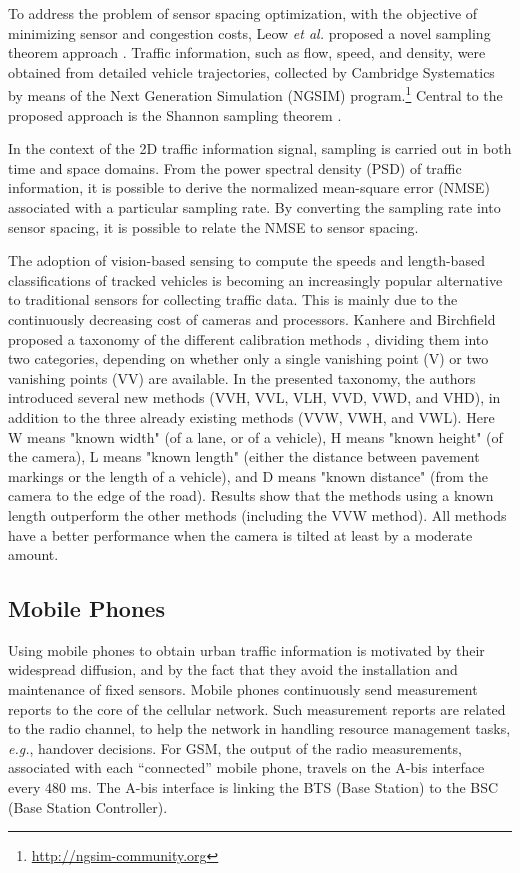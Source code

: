\documentclass[10pt,onecolumn]{article}
\begin{document}
To address the problem of sensor spacing optimization, with the objective of minimizing sensor and congestion costs, Leow \textit{et al.} proposed a novel sampling theorem approach \cite{Leow2008}. Traffic information, such as flow, speed, and density, were obtained from detailed vehicle trajectories, collected by Cambridge Systematics by means of the Next Generation Simulation (NGSIM) program.\footnote{\url{http://ngsim-community.org}}
Central to the proposed approach is the Shannon sampling theorem \cite{Shannon1949}. 

In the context of the 2D traffic information signal, sampling is carried out in both time and space domains. 
From the power spectral density (PSD) of traffic information, it is possible to derive the normalized mean-square error (NMSE) associated with a particular sampling rate. By converting the sampling rate into sensor spacing, it is possible to relate the NMSE to sensor spacing.

The adoption of vision-based sensing to compute the speeds and length-based classifications of tracked vehicles is becoming an increasingly popular alternative to traditional sensors for collecting traffic data.
This is mainly due to the continuously decreasing cost of cameras and processors. 
Kanhere and Birchfield proposed a taxonomy of the different calibration methods \cite{Kanhere2010}, dividing them into two categories, depending on whether only a single vanishing point (V) or two vanishing points (VV) are available. In the presented taxonomy, the authors introduced several new methods (VVH, VVL, VLH, VVD, VWD, and VHD), in addition to the three already existing methods (VVW, VWH, and VWL). 
Here W means "known width" (of a lane, or of a vehicle), H means "known height" (of the camera), L means "known length" (either the distance between pavement markings or the length of a vehicle), and D means "known distance" (from the camera to the edge of the road). 
Results show that the methods using a known length outperform the other methods (including the VVW method).
All methods have a better performance when the camera is tilted at least by a moderate amount.


\subsection{Mobile Phones}

Using mobile phones to obtain urban traffic information is motivated by their widespread diffusion, and by the fact that they avoid the installation and maintenance of fixed sensors.
Mobile phones continuously send measurement reports to the core of the cellular network. Such measurement reports are related to the radio channel, to help the network in handling resource management tasks, \textit{e.g.}, handover decisions. 
For GSM, the output of the radio measurements, associated with each ``connected'' mobile phone, travels on the A-bis interface every $480$ ms. The A-bis interface is linking the BTS (Base Station) to the BSC (Base Station Controller).
\end{document}
